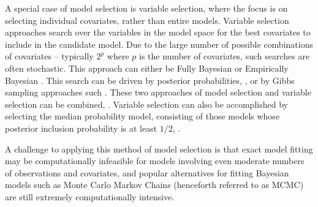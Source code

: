 A special case of model selection is variable selection, where the focus is on
selecting individual covariates, rather than entire models. Variable selection
approaches search over the variables in the model space for the best covariates
to include in the candidate model. Due to the large number of possible
combinations of covariates -- typically $2^p$ where $p$ is the number of
covariates, such searches are often stochastic. This approach can either be
Fully Bayesian or Empirically Bayesian \citep{Cui2008}.  This search can be
driven by posterior probabilities,  \cite{Casella2006}, or by Gibbs sampling
approaches such  \cite{George1993}. These two approaches of model selection and
variable selection can be combined,  \cite{Geweke1996}. Variable selection can
also be accomplished by selecting the median probability model, consisting of
those models whose posterior inclusion probability is at least $1/2$,
\cite{Barbieri2004}.

A challenge to applying this method of model selection is that exact model
fitting may be computationally infeasible for models involving even moderate
numbers of observations and covariates, and popular alternatives for fitting
Bayesian models such as Monte Carlo Markov Chains (henceforth referred to as
MCMC) are still extremely computationally intensive.






